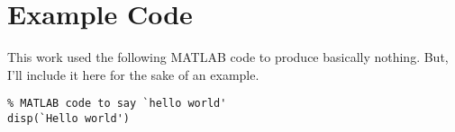 \chapter{Example Code}\label{appendixa}
This work used the following MATLAB code to produce basically nothing.  But, I'll include it here for the sake of an example.
\begin{lstlisting}
% MATLAB code to say `hello world'
disp(`Hello world')
\end{lstlisting}

